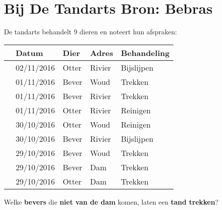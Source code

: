 \documentclass[12pt, a4paper]{article}
\begin{document}
	\begin{minipage}{\textwidth}
		\section{Bij De Tandarts \hfill\small Bron: Bebras}
			De tandarts behandelt 9 dieren en noteert hun afspraken:
			
			\begin{table}[H]
				\centering
				\begin{tabular}{|l|l|l|l|l|}
					\hline
					\ding{51} & \textbf{Datum} & \textbf{Dier} & \textbf{Adres} & \textbf{Behandeling} \\ \hline\hline
					&02/11/2016 & Otter & Rivier & Bijslijpen \\
					&01/11/2016 & Bever & Woud & Trekken \\
					&01/11/2016 & Bever & Rivier & Trekken \\	
					&01/11/2016 & Otter & Rivier & Reinigen \\
					&30/10/2016 & Otter & Woud & Reinigen \\
					&30/10/2016 & Bever & Rivier & Bijslijpen \\
					&29/10/2016 & Bever & Woud & Trekken \\
					&29/10/2016 & Bever & Dam & Trekken \\
					&29/10/2016 & Otter & Dam & Trekken \\
					\hline 
				\end{tabular}
			\end{table}
			
			Welke \textbf{bevers} die \textbf{niet van de dam} komen, laten een \textbf{tand trekken}?

	\end{minipage} \\ \\ 
		
\end{document}
